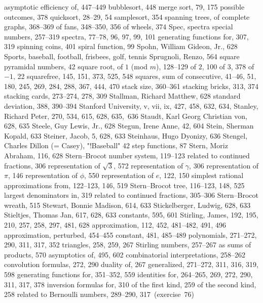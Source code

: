 \sub asymptotic efficiency of, 447--449
\sub bubblesort, 448
\sub merge sort, 79, 175
\sub possible outcomes, 378
\sub quicksort, 28--29, 54
\sub samplesort, 354
spanning trees,
\sub of complete graphs, 368--369
\sub of fans, 348--350, 356
\sub of wheels, 374
Spec, \see spectra
special numbers, 257--319
spectra, 77--78, 96, 97, 99, 101
\sub generating functions for, 307, 319
spinning coins, 401
spiral function, 99
Spohn, William Gideon, Jr., 628
Sports, \see baseball, football, frisbees, golf, tennis
Sprugnoli, Renzo, 564
square pyramidal numbers, 42
square root,
\sub of $1$ (mod $m$), 128--129
\sub of $2$, 100
\sub of $3$, 378
\sub of $-1$, 22
squarefree, 145, 151, 373, 525, 548
squares, sum of consecutive, 41--46, 51, 180, 245, 269, 284, 288, 367, 444, 470
stack size, 360--361
stacking bricks, 313, 374
stacking cards, 273--274, 278, 309
Stallman, Richard Matthew, 628
standard deviation, 388, 390--394
Stanford University, v, vii, ix, 427, 458, 632, 634, \cpage
Stanley, Richard Peter, 270, 534, 615, 628, 635,~636
Staudt, Karl Georg Christian von, 628, 635
Steele, Guy Lewis, Jr., 628
Stegun, Irene Anne, 42, 604
Stein, Sherman Kopald, 633
Steiner, Jacob, 5, 628, 633
Steinhaus, Hugo Dyonizy, 636
Stengel, Charles Dillon (= Casey), "!Baseball" 42
step functions, 87
Stern, Moriz Abraham, 116, 628
Stern--Brocot number system, 119--123
\sub related to continued fractions, 306
\sub representation of $\sqrt3$, 572
\sub representation of $\gamma$, 306
\sub representation of $\pi$, 146
\sub representation of $\phi$, 550
\sub representation of $e$, 122, 150
\sub simplest rational approximations from, 122--123, 146, 519
Stern--Brocot tree, 116--123, 148, 525
\sub largest denominators in, 319
\sub related to continued fractions, 305--306
Stern--Brocot wreath, 515
Stewart, Bonnie Madison, 614, 633
Stickelberger, Ludwig, 628, 633
Stieltjes, Thomas Jan, 617, 628, 633
 \sub constants, 595, 601
Stirling, James, 192, 195, 210, 257, 258, 297, 481, 628
\sub approximation, 112, 452, 481--482, 491, 496
\sub approximation, perturbed, 454--455
\sub constant, 481, 485--489
\sub polynomials, 271--272, 290, 311, 317, 352
\sub triangles, 258, 259, 267
Stirling numbers, 257--267
\sub as sums of products, 570
\sub asymptotics of, 495, 602
\sub combinatorial interpretations, 258--262
\sub convolution formulas, 272, 290
\sub duality of, 267
\sub generalized, 271--272, 311, 316, 319, 598
\sub generating functions for, 351--352, 559
\sub identities for, 264--265, 269, 272, 290, 311, 317, 378
\sub inversion formulas for, 310
\sub of the first kind, 259
\sub of the second kind, 258
\sub related to Bernoulli numbers, 289--290, 317~(exercise~76)
